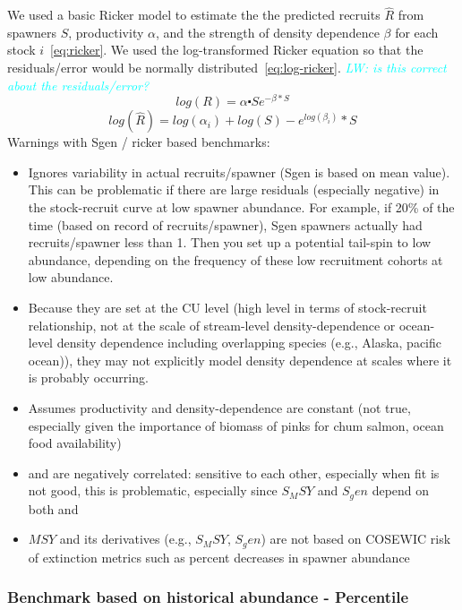 \documentclass[11pt]{book}
\begin{document}
We used a basic Ricker model to estimate the the predicted recruits \(\hat{R}\) from spawners \(S\), productivity \(\alpha\), and the strength of density dependence \(\beta\) for each stock \(i\)~\ref{eq:ricker}. We used the log-transformed Ricker equation so that the residuals/error would be normally distributed~\ref{eq:log-ricker}. \emph{\textcolor{cyan}{LW: is this correct about the residuals/error?}}
\begin{equation}
    log(R) = \alpha \centerdot S e^{-\beta * S} 
    \label{eq:ricker}
\end{equation}
\begin{equation}
  log(\hat{R}) = log(\alpha_i) + log(S) - e^{log(\beta_i)} * S 
  \label{eq:log-ricker}
\end{equation}
Warnings with Sgen / ricker based benchmarks:
\begin{itemize}

\item
  Ignores variability in actual recruits/spawner (Sgen is based on mean \alpha value). This can be problematic if there are large residuals (especially negative) in the stock-recruit curve at low spawner abundance. For example, if 20\% of the time (based on record of recruits/spawner), Sgen spawners actually had recruits/spawner less than 1. Then you set up a potential tail-spin to low abundance, depending on the frequency of these low recruitment cohorts at low abundance.
\item
  Because they are set at the CU level (high level in terms of stock-recruit relationship, not at the scale of stream-level density-dependence or ocean-level density dependence including overlapping species (e.g., Alaska, pacific ocean)), they may not explicitly model density dependence at scales where it is probably occurring.
\item
  Assumes productivity and density-dependence are constant (not true, especially given the importance of biomass of pinks for chum salmon, ocean food availability)
\item
  \alpha and \beta are negatively correlated: sensitive to each other, especially when fit is not good, this is problematic, especially since \(S_MSY\) and \(S_gen\) depend on both \alpha and \beta
\item
  \(MSY\) and its derivatives (e.g., \(S_MSY\), \(S_gen\)) are not based on COSEWIC risk of extinction metrics such as percent decreases in spawner abundance
\end{itemize}
\hypertarget{benchmark-based-on-historical-abundance---percentile}{%
\subsubsection{Benchmark based on historical abundance - Percentile}\label{benchmark-based-on-historical-abundance---percentile}}
\end{document}
